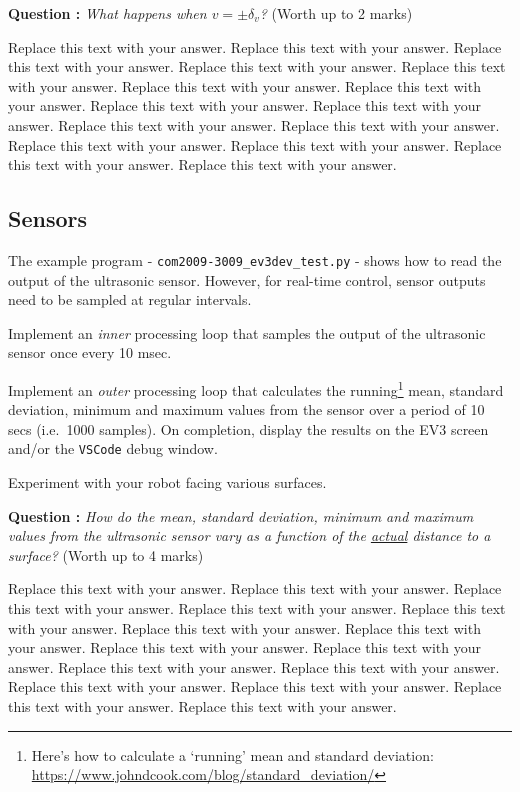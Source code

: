 \documentclass[hidelinks,a4paper,11pt]{article}
\newcounter{question}
\newcommand\myq{\refstepcounter{question}\thequestion}
\begin{document}
{\bfseries Question \myq:}  \emph{What happens when $v=\pm\delta_{v}$?} (Worth up to 2 marks)\\
\begin{mdframed}
Replace this text with your answer.  Replace this text with your answer.  Replace this text with your answer.  Replace this text with your answer.  Replace this text with your answer.  Replace this text with your answer.  Replace this text with your answer.  Replace this text with your answer.  Replace this text with your answer.  Replace this text with your answer.  Replace this text with your answer.  Replace this text with your answer.  Replace this text with your answer.  Replace this text with your answer.  Replace this text with your answer.
\end{mdframed}
\vspace*{\baselineskip}


\subsection{Sensors}

The example program - \texttt{com2009-3009\_ev3dev\_test.py} - shows how to read the output of the ultrasonic sensor.  However, for real-time control, sensor outputs need to be sampled at regular intervals.

\begin{todolist}
	\item Implement an \emph{inner} processing loop that samples the output of the ultrasonic sensor once every 10 msec.
	\item Implement an \emph{outer} processing loop that calculates the running\footnote{Here's how to calculate a `running' mean and standard deviation: \url{https://www.johndcook.com/blog/standard_deviation/}} mean, standard deviation, minimum and maximum values from the sensor over a period of 10 secs (i.e.\ 1000 samples).  On completion, display the results on the EV3 screen and/or the \texttt{VSCode} debug window.
	\item Experiment with your robot facing various surfaces.
\end{todolist}

{\bfseries Question \myq:}  \emph{How do the mean, standard deviation, minimum and maximum values from the ultrasonic sensor vary as a function of the \underline{actual} distance to a surface?} (Worth up to 4 marks)\\
\begin{mdframed}
Replace this text with your answer.  Replace this text with your answer.  Replace this text with your answer.  Replace this text with your answer.  Replace this text with your answer.  Replace this text with your answer.  Replace this text with your answer.  Replace this text with your answer.  Replace this text with your answer.  Replace this text with your answer.  Replace this text with your answer.  Replace this text with your answer.  Replace this text with your answer.  Replace this text with your answer.  Replace this text with your answer.
\end{mdframed}
\vspace*{\baselineskip}
\end{document}
